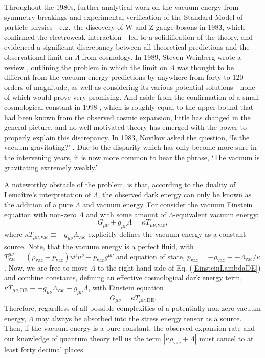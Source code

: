 Throughout the 1980s, further analytical work on the vacuum energy from symmetry breakings and experimental verification of the Standard Model of particle physics---e.g.~the discovery of W and Z gauge bosons in 1983, which confirmed the electroweak interaction---led to a solidification of the theory, and evidenced a significant discrepancy between all theoretical predictions and the observational limit on $\Lambda$ from cosmology. In 1989, Steven Weinberg wrote a review \cite{Weinberg1989}, outlining the problem in which the limit on $\Lambda$ was thought to be different from the vacuum energy predictions by anywhere from forty to 120 orders of magnitude, as well as considering its various potential solutions---none of which would prove very promising. And aside from the confirmation of a small cosmological constant in 1998 \cite{Riess1998,Perlmutter1999}, which is roughly equal to the upper bound that had been known from the observed cosmic expansion, little has changed in the general picture, and no well-motivated theory has emerged with the power to properly explain this discrepancy. In 1983, Novikov asked the question, `Is the vacuum gravitating?' \cite{Novikov1983}. Due to the disparity which has only become more sure in the intervening years, it is now more common to hear the phrase, `The vacuum is gravitating extremely weakly.'

A noteworthy obstacle of the problem, is that, according to the duality of Lema\^{i}tre's interpretation of $\Lambda$, the observed dark energy can only be known as the addition of a pure $\Lambda$ and vacuum energy. For consider the vacuum Einstein equation with non-zero $\Lambda$ and with some amount of $\Lambda$-equivalent vacuum energy:
\begin{equation}
G_{\mu\nu}+g_{\mu\nu}\Lambda=\kappa{T}_{\mu\nu,\mathrm{vac}},\label{EinsteinLambdaDE}
\end{equation}
where $\kappa{T}_{\mu\nu,\mathrm{vac}}\equiv-g_{\mu\nu}\Lambda_{\mathrm{vac}}$ explicitly defines the vacuum energy as a constant source. Note, that the vacuum energy is a perfect fluid, with $T^{\mu\nu}_{\mathrm{vac}}=(\rho_{\mathrm{vac}}+p_{\mathrm{vac}})u^{\mu}u^{\nu}+ p_{\mathrm{vac}}g^{\mu\nu}$ and equation of state, $p_{\mathrm{vac}}=-\rho_{\mathrm{vac}}\equiv-\Lambda_{\mathrm{vac}}/\kappa$. Now, we are free to move $\Lambda$ to the right-hand side of Eq. (\ref{EinsteinLambdaDE}) and combine constants, defining an effective cosmological dark energy term, $\kappa{T}_{\mu\nu,\mathrm{DE}}\equiv-g_{\mu\nu}\Lambda_{\mathrm{vac}}-g_{\mu\nu}\Lambda$, with Einstein equation
\begin{equation}
G_{\mu\nu}=\kappa{T}_{\mu\nu,\mathrm{DE}}.\label{EinsteinTDE}
\end{equation}
Therefore, regardless of all possible complexities of a potentially non-zero vacuum energy, $\Lambda$ may always be absorbed into the stress energy tensor as a source. Then, if the vacuum energy is a pure constant, the observed expansion rate and our knowledge of quantum theory tell us the term $|\kappa\rho_{\mathrm{vac}}+\Lambda|$ must cancel to at least forty decimal places.

